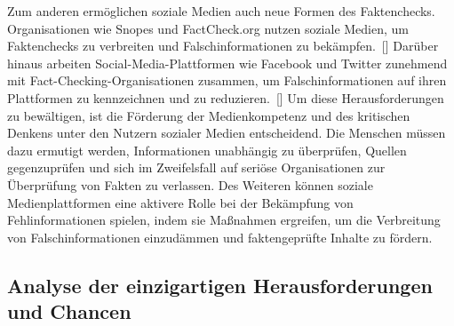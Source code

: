 \documentclass[a4paper,listof=totoc,bibliography=totoc]{scrartcl}
\begin{document}
\newline
\newline
Zum anderen ermöglichen soziale Medien auch neue Formen des Faktenchecks. Organisationen wie Snopes und FactCheck.org nutzen soziale Medien, um 
Faktenchecks zu verbreiten und Falschinformationen zu bekämpfen.~[\cite{Fung2012}] Darüber hinaus arbeiten Social-Media-Plattformen wie Facebook und 
Twitter zunehmend mit Fact-Checking-Organisationen zusammen, um Falschinformationen auf ihren Plattformen zu kennzeichnen und zu reduzieren.~[\cite{Pennycook2020}] Um diese 
Herausforderungen zu bewältigen, ist die Förderung der Medienkompetenz und des kritischen Denkens unter den Nutzern 
sozialer Medien entscheidend. Die Menschen müssen dazu ermutigt werden, Informationen unabhängig zu überprüfen, Quellen gegenzuprüfen und sich im Zweifelsfall auf seriöse 
Organisationen zur Überprüfung von Fakten zu verlassen. Des Weiteren können soziale Medienplattformen eine aktivere Rolle bei der Bekämpfung von Fehlinformationen spielen, 
indem sie Maßnahmen ergreifen, um die Verbreitung von Falschinformationen einzudämmen und faktengeprüfte Inhalte zu fördern.

\subsection{Analyse der einzigartigen Herausforderungen und Chancen}
\end{document}
